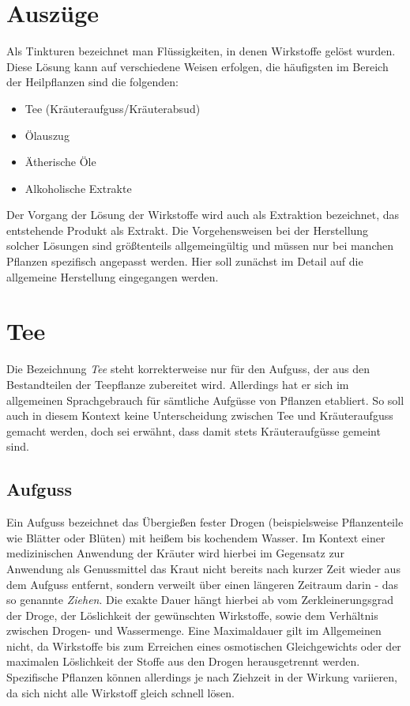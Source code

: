 \section{Auszüge}

Als Tinkturen bezeichnet man Flüssigkeiten, in denen Wirkstoffe gelöst wurden. Diese Lösung kann auf verschiedene Weisen erfolgen, die häufigsten im Bereich der Heilpflanzen sind die folgenden:
\begin{itemize}
	\item Tee (Kräuteraufguss/Kräuterabsud)
	\item Ölauszug
	\item Ätherische Öle
	\item Alkoholische Extrakte
\end{itemize}

Der Vorgang der Lösung der Wirkstoffe wird auch als Extraktion bezeichnet, das entstehende Produkt als Extrakt. Die Vorgehensweisen bei der Herstellung solcher Lösungen sind größtenteils allgemeingültig und müssen nur bei manchen Pflanzen spezifisch angepasst werden. Hier soll zunächst im Detail auf die allgemeine Herstellung eingegangen werden.

\section{Tee}
Die Bezeichnung \textit{Tee} steht korrekterweise nur für den Aufguss, der aus den Bestandteilen der Teepflanze zubereitet wird. Allerdings hat er sich im allgemeinen Sprachgebrauch für sämtliche Aufgüsse von Pflanzen etabliert. So soll auch in diesem Kontext keine Unterscheidung zwischen Tee und Kräuteraufguss gemacht werden, doch sei erwähnt, dass damit stets Kräuteraufgüsse gemeint sind.

\subsection{Aufguss}
Ein Aufguss bezeichnet das Übergießen fester Drogen (beispielsweise Pflanzenteile wie Blätter oder Blüten) mit heißem bis kochendem Wasser. Im Kontext einer medizinischen Anwendung der Kräuter wird hierbei im Gegensatz zur Anwendung als Genussmittel das Kraut nicht bereits nach kurzer Zeit wieder aus dem Aufguss entfernt, sondern verweilt über einen längeren Zeitraum darin - das so genannte \textit{Ziehen}. Die exakte Dauer hängt hierbei ab vom Zerkleinerungsgrad der Droge, der Löslichkeit der gewünschten Wirkstoffe, sowie dem Verhältnis zwischen Drogen- und Wassermenge. Eine Maximaldauer gilt im Allgemeinen nicht, da Wirkstoffe bis zum Erreichen eines osmotischen Gleichgewichts oder der maximalen Löslichkeit der Stoffe aus den Drogen herausgetrennt werden. Spezifische Pflanzen können allerdings je nach Ziehzeit in der Wirkung variieren, da sich nicht alle Wirkstoff gleich schnell lösen.
